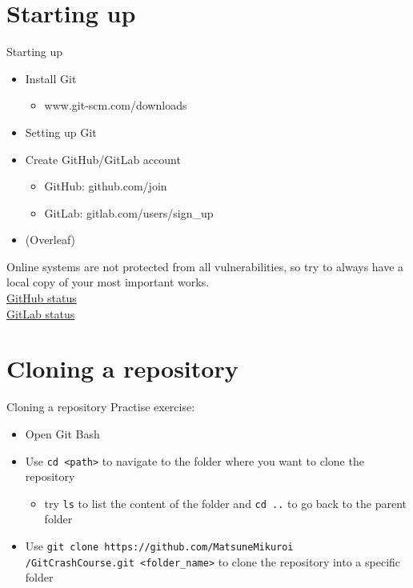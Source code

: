 \documentclass[show notes on second screen=right]{beamer}
\begin{document}
\section{Starting up}
\begin{frame}[t]{Starting up}
  \onslide<+->
  \begin{itemize}
    \item Install Git
    \begin{itemize}
      \item www.git-scm.com/downloads
    \end{itemize}
    \onslide<+->
    \item Setting up Git
    \onslide<+->
    \item Create GitHub/GitLab account
    \begin{itemize}
      \item GitHub: github.com/join
      \item GitLab: gitlab.com/users/sign\_up
    \end{itemize}
    \onslide<+->
    \item (Overleaf)
  \end{itemize}
  \onslide<+->
  Online systems are not protected from all vulnerabilities, so try to always have a local copy of your most important works.\\
  \href{https://www.githubstatus.com/uptime/hhtssxt0f5v2}{GitHub status}\\
  \href{https://status.gitlab.com}{GitLab status}
\end{frame}

\section{Cloning a repository}
\begin{frame}[t]{Cloning a repository}
  Practise exercise:
  \begin{itemize}
    \item Open Git Bash
    \item Use \texttt{cd <path>} to navigate to the folder where you want to clone the repository
    \begin{itemize}
      \item try \texttt{ls} to list the content of the folder and \texttt{cd ..} to go back to the parent folder
    \end{itemize}
    \item Use \texttt{git clone https://github.com/MatsuneMikuroi\\/GitCrashCourse.git <folder\_name>} to clone the repository into a specific folder
  \end{itemize}
\end{frame}
\end{document}
